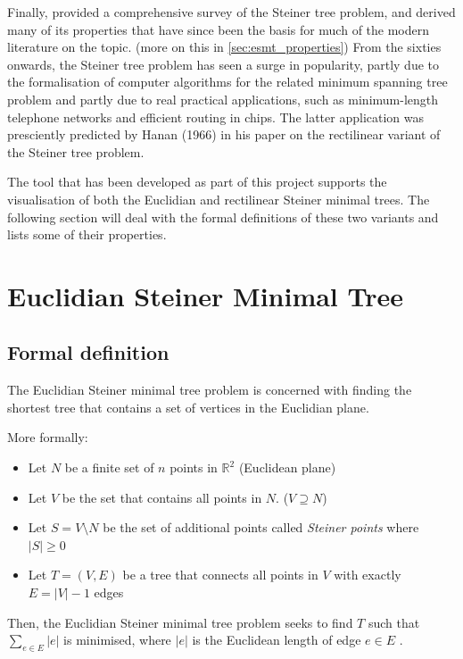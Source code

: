 \documentclass{l4proj}
\begin{document}
Finally, \cite{Gilbert1968SteinerMT} provided a comprehensive survey of the Steiner tree problem, and derived many of its properties that have since been the basis for much of the modern literature on the topic. (more on this in \ref{sec:esmt_properties}) From the sixties onwards, the Steiner tree problem has seen a surge in popularity, partly due to the formalisation of computer algorithms for the related minimum spanning tree problem and partly due to real practical applications, such as minimum-length telephone networks and efficient routing in chips. The latter application was presciently predicted by Hanan (1966) in his paper on the rectilinear variant of the Steiner tree problem.

The tool that has been developed as part of this project supports the visualisation of both the Euclidian and rectilinear Steiner minimal trees. The following section will deal with the formal definitions of these two variants and lists some of their properties.
\section{Euclidian Steiner Minimal Tree}

\subsection{Formal definition}
The Euclidian Steiner minimal tree problem is concerned with finding the shortest tree that contains a set of vertices in the Euclidian plane.

More formally:
\begin{itemize}
    \item Let $N$ be a finite set of $n$ points in $\mathbb{R}^2$ (Euclidean plane)
    \item Let $V$ be the set that contains all points in $N$. ($V \supseteq N$)
    \item Let $S = V \setminus N$ be the set of additional points called \textit{Steiner points} where $|S| \geq 0$
    \item Let $T = (V, E)$ be a tree that connects all points in $V$ with exactly $E = |V| - 1$ edges
\end{itemize}

Then, the Euclidian Steiner minimal tree problem seeks to find $T$ such that $\sum_{e \in E} |e|$ is minimised, where $|e|$ is the Euclidean length of edge $e \in E$ \citep{Brazil2014}.
\end{document}
